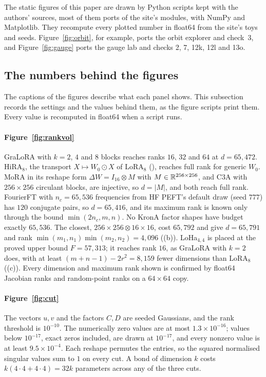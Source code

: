 The static figures of this paper are drawn by Python scripts kept with the authors' sources, most of them ports of the
site's modules, with NumPy and Matplotlib. They recompute every plotted number in float64 from the site's toys and seeds.
Figure~\ref{fig:orbit}, for example, ports the orbit explorer and check~3, and Figure~\ref{fig:gauge} ports the gauge lab
and checks 2, 7, 12k, 12l and 13o.

\subsection{The numbers behind the figures}\label{app:repro-figures}

The captions of the figures describe what each panel shows. This subsection records the settings and the values
behind them, as the figure scripts print them. Every value is recomputed in float64 when a script runs.

\paragraph{Figure~\ref{fig:rankvol}} GraLoRA with $k=2$, $4$ and $8$ blocks reaches ranks $16$, $32$ and $64$ at
$d=65{,}472$. HiRA$_8$, the transport $X\mapsto W_0\odot X$ of LoRA$_8$ (), reaches full rank
for generic $W_0$. MoRA in its reshape form $\Delta W=I_{16}\otimes M$ with $M\in\mathbb{R}^{256\times256}$, and C3A with
$256\times256$ circulant blocks, are injective, so $d=\lvert M\rvert$, and both reach full rank. FourierFT with
$n_c=65{,}536$ frequencies from HF PEFT's default draw (seed $777$) has $120$ conjugate pairs, so $d=65{,}416$, and its
maximum rank is known only through the bound $\min(2n_c,m,n)$. No KronA factor shapes have budget exactly $65{,}536$. The
closest, $256\times256\otimes16\times16$, cost $65{,}792$ and give $d=65{,}791$ and rank
$\min(m_1,n_1)\min(m_2,n_2)=4{,}096$ ((b)). LoHa$_{4,4}$ is placed at the proved upper bound
$F=57{,}313$; it reaches rank $16$, as GraLoRA with $k=2$ does, with at least $(m+n-1)-2r^2=8{,}159$ fewer dimensions
than LoRA$_8$ ((c)). Every dimension and maximum rank shown is confirmed by float64 Jacobian
ranks and random-point ranks on a $64\times64$ copy.

\paragraph{Figure~\ref{fig:cut}} The vectors $u,v$ and the factors $C,D$ are seeded Gaussians, and the rank threshold is
$10^{-10}$. The numerically zero values are at most $1.3\times10^{-16}$; values below $10^{-17}$, exact zeros included,
are drawn at $10^{-17}$, and every nonzero value is at least $9.5\times10^{-4}$. Each reshape permutes the entries, so
the squared normalised singular values sum to $1$ on every cut. A bond of dimension $k$ costs $k(4\cdot4+4\cdot4)=32k$
parameters across any of the three cuts.

